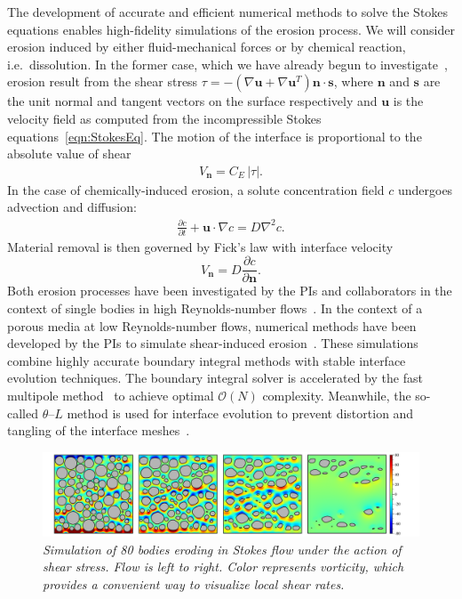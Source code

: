 \documentclass[11pt]{article}
\newcommand{\pd}[2]{ \frac{ \partial #1}{ \partial #2 } }
\newcommand{\bvec}[1]{{\mathbf{#1}}}
\newcommand{\grad}{\nabla}
\newcommand {\Lap} {\grad^2}
\newcommand{\abs}[1]{\left| #1 \right|}
\newcommand{\uu}{\bvec{u}}
\newcommand{\nn}{{\mathbf{n}}}
\renewcommand{\ss}{{\mathbf{s}}}
\newcommand{\Vn}{V_\nn}
\newcommand{\CE}{C_E}
\newcommand {\ny}{\mathbf{n}}
\newcommand{\Diff}{D}
\newcommand{\thL}{$\theta$--$L$}
\begin{document}
The development of accurate and efficient numerical methods to solve the Stokes equations enables high-fidelity simulations of the erosion process. We will consider erosion induced by either fluid-mechanical forces or by chemical reaction, i.e.~dissolution. In the former case, which we have already begun to investigate~\cite{Quaife2018}, erosion result from the shear stress $\tau = -\left(\nabla \uu + \nabla \uu^T \right)\nn \cdot \ss$, where $\nn$ and $\ss$ are the unit normal and tangent vectors on the surface respectively and $\uu$ is the velocity field as computed from the incompressible Stokes equations~\eqref{eqn:StokesEq}. The motion of the interface is proportional to the absolute value of shear 
\begin{align}
  \Vn = \CE \, \abs{\tau}.
\end{align}
In the case of chemically-induced erosion, a solute concentration field $c$ undergoes advection and diffusion:
\begin{align}
  \label{Ceq}
  \pd{c}{t} + \uu \cdot \grad c = \Diff \Lap c.
\end{align}
Material removal is then governed by Fick's law with interface velocity
\begin{equation}
\label{DissVn}
\Vn = \Diff \pd{c}{\ny}.
\end{equation}
Both erosion processes have been investigated by the PIs and collaborators in the context of single bodies in high Reynolds-number flows~\cite{Ristroph2012, MoorePOF2013, HuangJFM2015, MooreCPAM2017}. In the context of a porous media at low Reynolds-number flows, numerical methods have been developed by the PIs to simulate shear-induced erosion~\cite{Quaife2018, chi-moo-qua2019}. These simulations combine highly accurate boundary integral methods with stable interface evolution techniques.  The boundary integral solver is accelerated by the fast multipole method~\cite{gre-rok1987, gre-gre-may1992} to achieve optimal $\mathcal{O}(N)$ complexity. Meanwhile, the so-called {\thL} method is used for interface evolution to prevent distortion and tangling of the interface meshes~\cite{hou1994removing, MoorePOF2013, Quaife2018}.

\begin{figure}%
\begin{center}
\includegraphics[width = 0.99 \textwidth]{./figs/80circ8vort.pdf}
\caption{\label{80circ8vort} \em Simulation of 80 bodies eroding in Stokes flow under the action of shear stress. Flow is left to right. Color represents vorticity, which provides a convenient way to visualize local shear rates. 
}
\end{center}
\end{figure}
 
\end{document}

